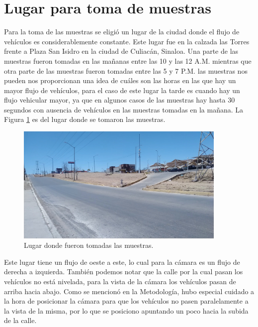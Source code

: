 \section{Lugar para toma de muestras}

Para la toma de las muestras se eligió un lugar de la ciudad donde el flujo de vehículos es considerablemente constante. Este lugar fue en la calzada las Torres frente a Plaza San Isidro en la ciudad de Culiacán, Sinaloa. Una parte de las muestras fueron tomadas en las mañanas entre las 10 y las 12 A.M. mientras que otra parte de las muestras fueron tomadas entre las 5 y 7 P.M. las muestras nos pueden nos proporcionan una idea de cuáles son las horas en las que hay un mayor flujo de vehículos, para el caso de este lugar la tarde es cuando hay un flujo vehicular mayor, ya que en algunos casos de las muestras hay hasta 30 segundos con ausencia de vehículos en las muestras tomadas en la mañana. La Figura \ref{fig:LugarMuestras} es del lugar donde se tomaron las muestras.

\begin{figure}[H]
    \centering
    \includegraphics[width=0.9\textwidth]{Resultados/imgs/LugarMuestras.jpg}
    \caption{Lugar donde fueron tomadas las muestras.}
    \label{fig:LugarMuestras}
\end{figure}

Este lugar tiene un flujo de oeste a este, lo cual para la cámara es un flujo de derecha a izquierda. También podemos notar que la calle por la cual pasan los vehículos no está nivelada, para la vista de la cámara los vehículos pasan de arriba hacia abajo. Como se mencionó en la Metodología, hubo especial cuidado a la hora de posicionar la cámara para que los vehículos no pasen paralelamente a la vista de la misma, por lo que se posiciono apuntando un poco hacia la subida de la calle.
